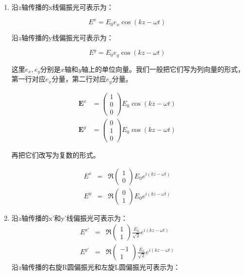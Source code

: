 \begin{enumerate}
\item 

沿$z$轴传播的x线偏振光可表示为：

\begin{equation}
E^{x} = E_0 e_x \cos (k z - \omega t)~ 
\end{equation}

沿$z$轴传播的y线偏振光可表示为：

\begin{equation}
E^{y} = E_0 e_y \cos (k z - \omega t)~
\end{equation}

这里$e_x, e_y$分别是$x$轴和$y$轴上的单位向量。我们一般把它们写为列向量的形式，第一行对应$e_x$分量，第二行对应$e_y$分量。

\begin{align}
\mathbf{E}^{x} &= \begin{pmatrix} 
1 \\ 
0 \\
0 
\end{pmatrix} E_0 \cos(kz - \omega t) \\
\mathbf{E}^{y} &= \begin{pmatrix} 
0 \\
1 \\
0 
\end{pmatrix} E_0 \cos(kz - \omega t)~
\end{align}

再把它们改写为复数的形式。

\begin{align}
E^{x} & = & \Re \left( \begin{array}{ccc} 1 \\ 0  \end{array} \right)  E_0 e^{i ( kz - \omega t  )}~  \\
E^{y} & = & \Re \left( \begin{array}{ccc} 0 \\ 1  \end{array} \right)  E_0 e^{i ( kz - \omega t  ) }~  
\end{align}

\item

沿$z$轴传播的x'和y'线偏振光可表示为：
\begin{align}
E^{x'} & = & \Re \left( \begin{array}{ccc} 1 \\ 1  \end{array} \right)  \frac{ E_0 }{ \sqrt{2} }   e^{i ( kz - \omega t  )}~  \\
E^{y'} & = & \Re \left( \begin{array}{ccc} -1 \\ 1  \end{array} \right)  \frac{E_0}{ \sqrt{2} }  e^{i ( kz - \omega t  ) }~
\end{align}
沿$z$轴传播的右旋R圆偏振光和左旋L圆偏振光可表示为：


\end{enumerate}
